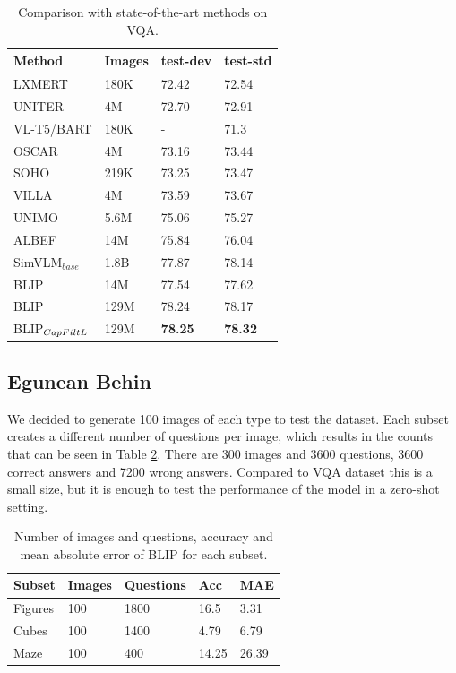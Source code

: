 \documentclass[11pt]{article}
\begin{document}
\begin{table}[ht]
\centering
\begin{tabular}{llll}
\toprule
Method        & Images & test-dev & test-std \\ \midrule
LXMERT        & 180K              & 72.42    & 72.54    \\
UNITER        & 4M                & 72.70    & 72.91    \\
VL-T5/BART    & 180K              & -        & 71.3     \\
OSCAR         & 4M                & 73.16    & 73.44    \\
SOHO          & 219K              & 73.25    & 73.47    \\
VILLA         & 4M                & 73.59    & 73.67    \\
UNIMO         & 5.6M              & 75.06    & 75.27    \\
ALBEF         & 14M               & 75.84    & 76.04    \\
SimVLM$_{base}$   & 1.8B              & 77.87    & 78.14    \\ \midrule
BLIP          & 14M               & 77.54    & 77.62    \\
BLIP          & 129M              & 78.24    & 78.17    \\
BLIP$_{CapFilt\-L}$ & 129M              & \textbf{78.25}    & \textbf{78.32}    \\ \bottomrule
\end{tabular}
\caption{Comparison with state-of-the-art methods on VQA.}
\label{tab:results_vqa}
\end{table}

\subsection{Egunean Behin}

We decided to generate 100 images of each type to test the dataset. Each subset creates a different number of questions per image, which results in the counts that can be seen in Table \ref{tab:results_egunean_behin}. There are 300 images and 3600 questions, 3600 correct answers and 7200 wrong answers. Compared to VQA dataset this is a small size, but it is enough to test the performance of the model in a zero-shot setting.

\begin{table}[ht]
\centering
\begin{tabular}{lllll}
\toprule
Subset  & Images & Questions & Acc   & MAE   \\ \midrule
Figures & 100    & 1800      & 16.5  & 3.31  \\
Cubes   & 100    & 1400      & 4.79  & 6.79  \\
Maze    & 100    & 400       & 14.25 & 26.39 \\ \bottomrule
\end{tabular}
\caption{Number of images and questions, accuracy and mean absolute error of BLIP for each subset.}
\label{tab:results_egunean_behin}
\end{table}
\end{document}
